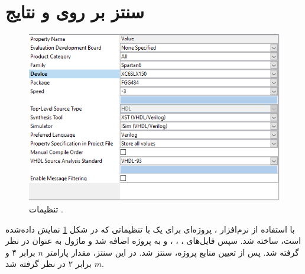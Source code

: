 \documentclass[conference]{IEEEtran-ModifiedForMVIP}
\begin{document}
\section{سنتز بر روی
و نتایج}

\begin{figure}[t]
\centering
\includegraphics[width=\linewidth]{Images/FPGASettings.png}
\caption{
\centering
تنظیمات
.
}\label{fig:FPGASettings}
\end{figure}

با استفاده از نرم‌افزار
،
پروژه‌ای برای یک
با تنظیماتی که در شکل
\ref{fig:FPGASettings}
نمایش داده‌شده است، ساخته شد.
سپس فایل‌های
،
،
،
و
به
پروژه اضافه شد و
ماژول
به عنوان
در نظر گرفته شد. پس از تعیین منابع پروژه،
سنتز شد. در این سنتز، مقدار پارامتر
$n$
برابر ۴ و
$m$
برابر ۲ در نظر گرفته شد.
\end{document}
